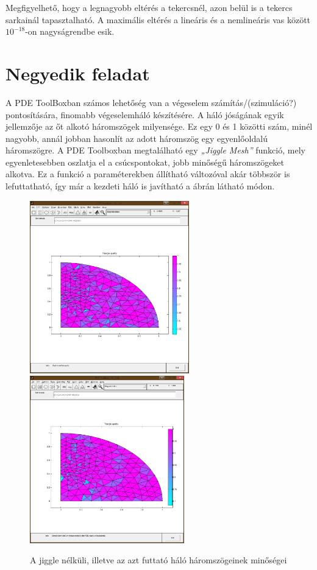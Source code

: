 Megfigyelhető, hogy a legnagyobb eltérés a tekercsnél, azon belül is a tekercs sarkainál tapasztalható. A maximális eltérés a lineáris és a nemlineáris vas között $ 10^{-18} $-on nagyságrendbe esik.




\section{Negyedik feladat}

A PDE ToolBoxban számos lehetőség van a végeselem számítás/(szimuláció?) pontosítására, finomabb végeselemháló készítésére. A háló jóságának egyik jellemzője az őt alkotó háromszögek milyensége. Ez egy 0 és 1 közötti szám, minél nagyobb, annál jobban hasonlít az adott háromszög egy egyenlőoldalú háromszögre. A PDE Toolboxban megtalálható egy \textit{„Jiggle Mesh”} funkció, mely egyenletesebben oszlatja el a csúcspontokat, jobb minőségű háromszögeket alkotva. Ez a funkció a paraméterekben állítható változóval akár többször is lefuttatható, így már a kezdeti háló is javítható a  ábrán látható módon.
\begin{figure}[!h]
	\centering
	\includegraphics[trim = 25mm 50mm 10mm 70mm,clip, width=69mm, keepaspectratio]{figures/terek/nl_1_3szog0.png}\hspace{5mm}
	\includegraphics[trim = 25mm 50mm 10mm 70mm,clip, width=67mm, keepaspectratio]{figures/terek/nl_1_3szog1.png}
	\caption{A jiggle nélküli, illetve az azt futtató háló háromszögeinek minőségei}
	\label{fig:jiggle}
\end{figure}

